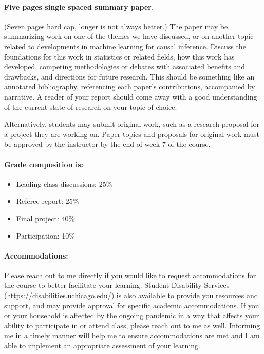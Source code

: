 \documentclass[letterpaper, 12pt, parskip=full,DIV=10]{scrartcl}
\begin{document}
\paragraph{Five pages single spaced summary paper.} (Seven pages hard cap, longer is not always better.)
The paper may be summarizing work on one of the themes we have discussed, or on another topic related to developments in machine learning for causal inference. Discuss the foundations for this work in statistics or related fields, how this work has developed, competing methodologies or debates with associated benefits and drawbacks, and directions for future research. This should be something like an annotated bibliography, referencing each paper's contributions, accompanied by narrative. A reader of your report should come away with a good understanding of the current state of research on your topic of choice. 

Alternatively, students may submit original work, such as a research proposal for a project they are working on. 
Paper topics and proposals for original work must be approved by the instructor by the end of week 7 of the course. 


\paragraph{Grade composition is:}

\begin{itemize}[topsep=0pt,itemsep=-1ex,partopsep=1ex,parsep=1ex]
\item Leading class discussions: 25\% 
\item Referee report: 25\%
\item Final project: 40\%
\item Participation: 10\%
\end{itemize}

\paragraph{Accommodations:} Please reach out to me directly if you would like to request accommodations for the course to better facilitate your learning. Student Disability Services (\url{https://disabilities.uchicago.edu/}) is also available to provide you resources and support, and may provide approval for specific academic accommodations. If you or your household is affected by the ongoing pandemic in a way that affects your ability to participate in or attend class, please reach out to me as well. Informing me in a timely manner will help me to ensure accommodations are met and I am able to implement an appropriate assessment of your learning. 
\end{document}
